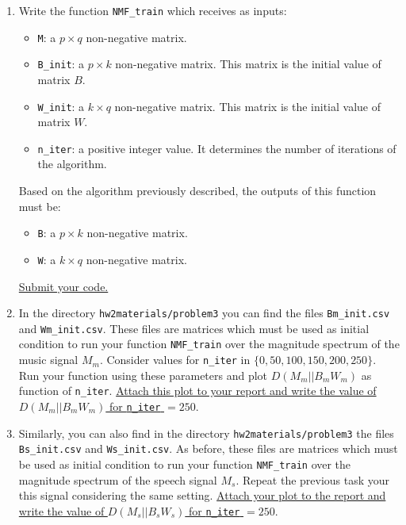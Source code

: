 \begin{enumerate}
    \item Write the function \texttt{NMF\_train} which receives as inputs:
    \begin{itemize}
        \item \texttt{M}: a $p \times q$ non-negative matrix. 
        \item \texttt{B\_init}:  a $p \times k$ non-negative matrix. This matrix is the initial value of matrix $B$.
        \item \texttt{W\_init}: a $k \times q$ non-negative matrix. This matrix is the initial value of matrix $W$.
        \item \texttt{n\_iter}: a positive integer value. It determines the number of iterations of the algorithm.
    \end{itemize}
    Based on the algorithm previously described, the outputs of this function must be:
    \begin{itemize}
        \item \texttt{B}: a $p \times k$ non-negative matrix. 
        \item \texttt{W}: a $k \times q$ non-negative matrix.
    \end{itemize}
    \ul{Submit your code.}
    
    \item In the directory \texttt{hw2materials/problem3} you can find the files \texttt{Bm\_init.csv} and \texttt{Wm\_init.csv}. These files are matrices which must be used as initial condition to run your function \texttt{NMF\_train} over the magnitude spectrum of the music signal $M_m$. Consider values for \texttt{n\_iter} in $\{0, 50, 100, 150, 200, 250\}$. Run your function using these parameters and plot $D(M_m || B_mW_m)$ as function of \texttt{n\_iter}. \ul{Attach this plot to your report and write the value of $D(M_m||B_mW_m)$ for \texttt{n\_iter} $= 250$}.
    
    \item Similarly, you can also find in the directory \texttt{hw2materials/problem3} the files \texttt{Bs\_init.csv} and \texttt{Ws\_init.csv}. As before, these files are matrices which must be used as initial condition to run your function \texttt{NMF\_train} over the magnitude spectrum of the speech signal $M_s$. Repeat the previous task your this signal considering the same setting. \ul{Attach your plot to the report and write the value of $D(M_s||B_sW_s)$ for \texttt{n\_iter} $= 250$}. 
    
\end{enumerate}


